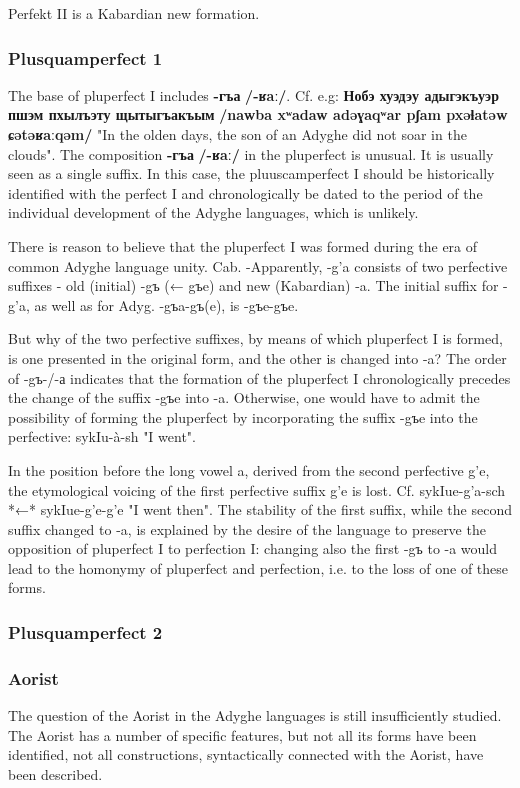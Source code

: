 \documentclass[a4paper,12pt]{book}
\newcommand{\1}[1]{\textbf{\emph{#1}}} %
\newcommand{\2}[1]{\textbf{[#1]}} %
\newcommand{\3}[1]{\fontsize{11pt}{0cm}\textbf{\emph{#1}}} %
\newcommand{\4}[1]{\fontsize{10pt}{0cm}\emph{#1}}	%
\newcommand{\5}[1]{\textbf{/#1/}} %
\newcommand{\6}[1]{\textbf{[#1]}} %
\newcommand{\7}[1]{\fontsize{12pt}{0cm}\emph{#1}} %
\newcommand{\8}[1]{\fontsize{12pt}{0cm}`#1'} %
\newcommand{\9}[1]{\fontsize{12pt}{0cm}(lit. `#1')} %
\newcommand{\glossphonemics}[1]{\textbf{/#1/}} %
\begin{document}
Perfekt II is a Kabardian new formation.
\subsubsection{Plusquamperfect 1}
The base of pluperfect I includes \textbf{-гъа} \glossphonemics{-ʁaː}. Cf. e.g:
\textbf{Нобэ хуэдэу адыгэкъуэр пшэм пхылъэту щытыгъакъым} \glossphonemics{nawba xʷadaw adəɣaqʷar pʃam pxəɬatəw ɕətəʁaːqəm} "In the olden days, the son of an Adyghe did not soar in the clouds".
The composition \textbf{-гъа} \glossphonemics{-ʁaː} in the pluperfect is unusual. It is usually seen as a single suffix. In this case, the pluuscamperfect I should be historically identified with the perfect I and chronologically be dated to the period of the individual development of the Adyghe languages, which is unlikely.

There is reason to believe that the pluperfect I was formed during the era of common Adyghe language unity. Cab. -Apparently, -g'a consists of two perfective suffixes - old (initial) -gъ (← gъe) and new (Kabardian) -a. The initial suffix for -g'a, as well as for Adyg. -gъa-gъ(e), is -gъe-gъe.

But why of the two perfective suffixes, by means of which pluperfect I is formed, is one presented in the original form, and the other is changed into -a? The order of -gъ-/-а indicates that the formation of the pluperfect I chronologically precedes the change of the suffix -gъe into -a. Otherwise, one would have to admit the possibility of forming the pluperfect by incorporating the suffix -gъe into the perfective: sykIu-à-sh "I went".

In the position before the long vowel a, derived from the second perfective g'e, the etymological voicing of the first perfective suffix g'e is lost. Cf. sykIue-g'a-sch *←* sykIue-g'e-g'e "I went then". The stability of the first suffix, while the second suffix changed to -a, is explained by the desire of the language to preserve the opposition of pluperfect I to perfection I: changing also the first -gъ to -a would lead to the homonymy of pluperfect and perfection, i.e. to the loss of one of these forms.
\subsubsection{Plusquamperfect 2}
\subsubsection{Aorist}
The question of the Aorist in the Adyghe languages is still insufficiently studied. The Aorist has a number of specific features, but not all its forms have been identified, not all constructions, syntactically connected with the Aorist, have been described.
\end{document}
